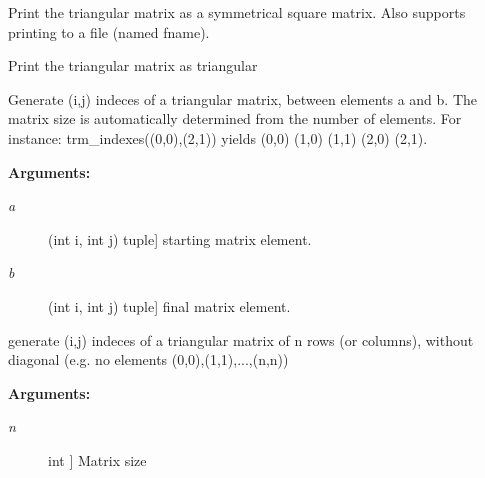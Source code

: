 \documentclass[letterpaper,10pt,english]{sphinxmanual}
\begin{document}
\begin{fulllineitems}
\begin{fulllineitems}
\label{index:encore.utils.TriangularMatrix.square_print}
Print the triangular matrix as a symmetrical square matrix.
Also supports printing to a file (named fname).

\end{fulllineitems}


\begin{fulllineitems}
\label{index:encore.utils.TriangularMatrix.trm_print}
Print the triangular matrix as triangular

\end{fulllineitems}


\end{fulllineitems}


\begin{fulllineitems}
\label{index:encore.utils.trm_indeces}
Generate (i,j) indeces of a triangular matrix, between elements a and b. The matrix size is automatically determined from the number of elements.
For instance: trm\_indexes((0,0),(2,1)) yields (0,0) (1,0) (1,1) (2,0) (2,1).

\textbf{Arguments:}
\begin{description}
\item[{\emph{a}}] \leavevmode{[}(int i, int j) tuple{]}
starting matrix element.

\item[{\emph{b}}] \leavevmode{[}(int i, int j) tuple{]}
final matrix element.

\end{description}

\end{fulllineitems}


\begin{fulllineitems}
\label{index:encore.utils.trm_indeces_nodiag}
generate (i,j) indeces of a triangular matrix of n rows (or columns), without diagonal (e.g. no elements (0,0),(1,1),...,(n,n))

\textbf{Arguments:}
\begin{description}
\item[{\emph{n}}] \leavevmode{[}int {]}
Matrix size

\end{description}

\end{fulllineitems}
\end{document}
